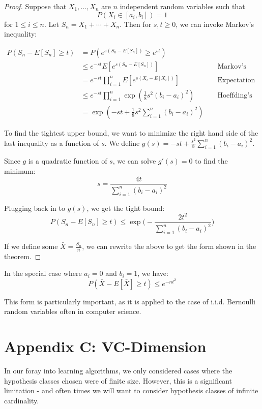 \documentclass{article}
\begin{document}
\begin{proof}
Suppose that $X_1, \dots, X_n$ are $n$ independent random variables such that
$$P(X_i \in [a_i, b_i]) = 1$$ for $1 \leq i \leq n$. Let $S_n = X_1 + \cdots + X_n$.
Then for $s, t \geq 0$, we can invoke Markov's inequality:

\begin{align*}
    P(S_n - E[S_n] \geq t) &= P(e^{s(S_n-E[S_n])} \geq e^{st})\\
        &\leq e^{-st} E[e^{s(S_n - E[S_n])}]&&\text{ Markov's inequality}\\
        &= e^{-st} \prod_{i=1}^n E[e^{s(X_i-E[X_i])}]&&\text{ Expectation of product of indep. R.V.s}\\
        &\leq e^{-st} \prod_{i=1}^n \exp(\frac{1}{8} s^2(b_i - a_i)^2)&&\text{ Hoeffding's Lemma}\\
        &= \exp(-st + \frac{1}{8} s^2 \sum_{i=1}^n (b_i - a_i)^2)
\end{align*}

To find the tightest upper bound, we want to minimize the right hand side of the
last inequality as a function of $s$. We define $g(s) = -st + \frac{s^2}{8}\sum_{i=1}^n(b_i - a_i)^2$.

Since $g$ is a quadratic function of $s$, we can solve $g'(s) = 0$ to find the minimum:
$$s = \frac{4t}{\sum_{i=1}^n (b_i-a_i)^2}$$

Plugging back in to $g(s)$, we get the tight bound:
$$P(S_n - E[S_n] \geq t) \leq \exp\bigg(-\frac{2t^2}{\sum_{i=1}^n(b_i-a_i)^2}\bigg)$$

If we define some $\bar{X} = \frac{S_n}{n}$, we can rewrite the above to get the
form shown in the theorem.

\end{proof}

In the special case where $a_i = 0$ and $b_i = 1$, we have:
$$P(\bar{X} - E[\bar{X}] \geq t) \leq e^{-nt^2}$$

This form is particularly important, as it is applied to the case of i.i.d.
Bernoulli random variables often in computer science.

\section{Appendix C: VC-Dimension}

In our foray into learning algorithms, we only considered cases where the
hypothesis classes chosen were of finite size. However, this is a significant
limitation - and often times we will want to consider hypothesis classes of
infinite cardinality.
\end{document}
